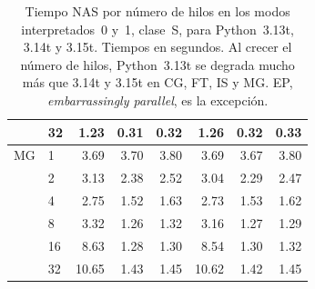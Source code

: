 \begin{table}[H]
{\begin{tabular}{llrrrrrr}
 & 32 & 1.23 & 0.31 & 0.32 & 1.26 & 0.32 & 0.33 \\
\hline
MG & 1 & 3.69 & 3.70 & 3.80 & 3.69 & 3.67 & 3.80 \\
 & 2 & 3.13 & 2.38 & 2.52 & 3.04 & 2.29 & 2.47 \\
 & 4 & 2.75 & 1.52 & 1.63 & 2.73 & 1.53 & 1.62 \\
 & 8 & 3.32 & 1.26 & 1.32 & 3.16 & 1.27 & 1.29 \\
 & 16 & 8.63 & 1.28 & 1.30 & 8.54 & 1.30 & 1.32 \\
 & 32 & 10.65 & 1.43 & 1.45 & 10.62 & 1.42 & 1.45 \\
\hline
\end{tabular}
}
\caption{Tiempo NAS por número de hilos en los modos interpretados~0 y~1,
clase~S, para Python~3.13t, 3.14t y 3.15t. Tiempos en segundos. Al crecer el
número de hilos, Python~3.13t se degrada mucho más que 3.14t y 3.15t en CG, FT,
IS y MG. EP, \emph{embarrassingly parallel}, es la excepción.}
\label{tab:versiones-interpretado-completo}
\end{table}
